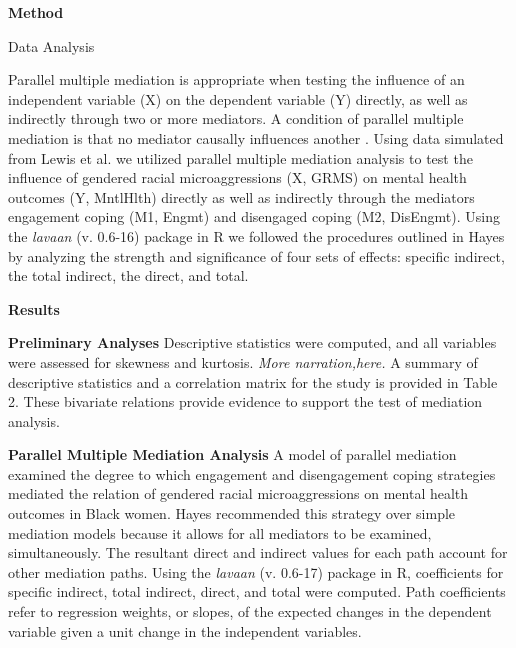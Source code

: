 \documentclass[
  11pt,
]{book}
\begin{document}
\textbf{Method}

Data Analysis

Parallel multiple mediation is appropriate when testing the influence of an independent variable (X) on the dependent variable (Y) directly, as well as indirectly through two or more mediators. A condition of parallel multiple mediation is that no mediator causally influences another \citep{hayes_more_2022}. Using data simulated from Lewis et al. \citeyearpar{lewis_applying_2017} we utilized parallel multiple mediation analysis to test the influence of gendered racial microaggressions (X, GRMS) on mental health outcomes (Y, MntlHlth) directly as well as indirectly through the mediators engagement coping (M1, Engmt) and disengaged coping (M2, DisEngmt). Using the \emph{lavaan} (v. 0.6-16) package in R we followed the procedures outlined in Hayes \citeyearpar{hayes_more_2022} by analyzing the strength and significance of four sets of effects: specific indirect, the total indirect, the direct, and total.

\textbf{Results}

\textbf{Preliminary Analyses} Descriptive statistics were computed, and all variables were assessed for skewness and kurtosis. \emph{More narration,here.} A summary of descriptive statistics and a correlation matrix for the study is provided in Table 2. These bivariate relations provide evidence to support the test of mediation analysis.

\textbf{Parallel Multiple Mediation Analysis} A model of parallel mediation examined the degree to which engagement and disengagement coping strategies mediated the relation of gendered racial microaggressions on mental health outcomes in Black women. Hayes \citeyearpar{hayes_more_2022} recommended this strategy over simple mediation models because it allows for all mediators to be examined, simultaneously. The resultant direct and indirect values for each path account for other mediation paths. Using the \emph{lavaan} (v. 0.6-17) package in R, coefficients for specific indirect, total indirect, direct, and total were computed. Path coefficients refer to regression weights, or slopes, of the expected changes in the dependent variable given a unit change in the independent variables.
\end{document}
